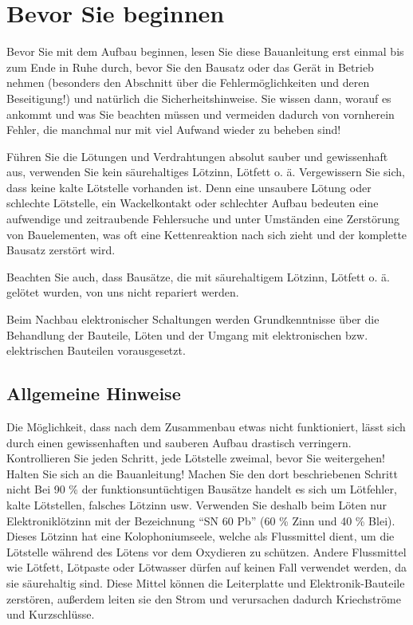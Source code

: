 \documentclass[fleqn,10pt]{SelfArx} %
\begin{document}

\section{Bevor Sie beginnen}

Bevor Sie mit dem Aufbau beginnen, lesen Sie diese Bauanleitung erst einmal bis zum Ende in Ruhe durch, bevor Sie den Bausatz oder das Gerät in Betrieb nehmen (besonders den Abschnitt über die Fehlermöglichkeiten und deren Beseitigung!) und natürlich die Sicherheitshinweise. Sie wissen dann, worauf es ankommt und was Sie beachten müssen und vermeiden dadurch von vornherein Fehler, die manchmal nur mit viel Aufwand wieder zu beheben sind!

Führen Sie die Lötungen und Verdrahtungen absolut sauber und gewissenhaft aus, verwenden Sie kein säurehaltiges Lötzinn, Lötfett o. ä. Vergewissern Sie sich, dass keine kalte Lötstelle vorhanden ist. Denn eine unsaubere Lötung oder schlechte Lötstelle, ein Wackelkontakt oder schlechter Aufbau bedeuten eine aufwendige und zeitraubende Fehlersuche und unter Umständen eine Zerstörung von Bauelementen, was oft eine Kettenreaktion nach sich zieht und der komplette Bausatz zerstört wird.

Beachten Sie auch, dass Bausätze, die mit säurehaltigem Lötzinn, Lötfett o. ä. gelötet wurden, von uns nicht repariert werden.

Beim Nachbau elektronischer Schaltungen werden Grundkenntnisse über die Behandlung der Bauteile, Löten und der Umgang mit elektronischen bzw. elektrischen Bauteilen vorausgesetzt.

 \subsection*{Allgemeine Hinweise}

Die Möglichkeit, dass nach dem Zusammenbau etwas nicht funktioniert, lässt sich durch einen gewissenhaften und sauberen Aufbau drastisch verringern. Kontrollieren Sie jeden Schritt, jede Lötstelle zweimal, bevor Sie weitergehen! Halten Sie sich an die Bauanleitung! Machen Sie den dort beschriebenen Schritt nicht Bei 90 \% der funktionsuntüchtigen Bausätze handelt es sich um Lötfehler, kalte Lötstellen, falsches Lötzinn usw. Verwenden Sie deshalb beim Löten nur Elektroniklötzinn mit der Bezeichnung “SN 60 Pb” (60 \% Zinn und 40 \% Blei). Dieses Lötzinn hat eine Kolophoniumseele, welche als Flussmittel dient, um die Lötstelle während des Lötens vor dem Oxydieren zu schützen. Andere Flussmittel wie Lötfett, Lötpaste oder Lötwasser dürfen auf keinen Fall verwendet werden, da sie säurehaltig sind. Diese Mittel können die Leiterplatte und Elektronik-Bauteile zerstören, außerdem leiten sie den Strom und verursachen dadurch Kriechströme und Kurzschlüsse.
\end{document}
